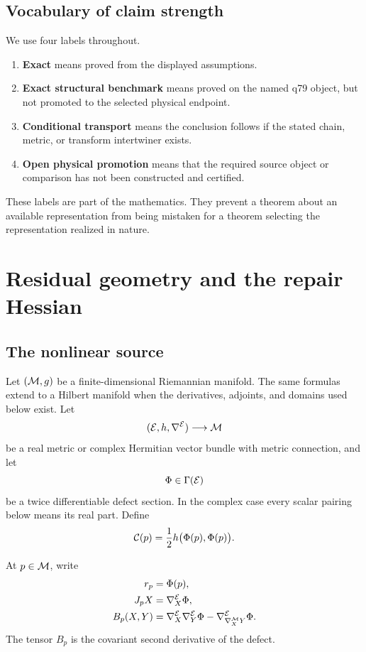 \documentclass[11pt,a4paper]{article}
\begin{document}
\subsection{Vocabulary of claim strength}

We use four labels throughout.
\begin{enumerate}
\item \textbf{Exact} means proved from the displayed assumptions.
\item \textbf{Exact structural benchmark} means proved on the named q79
object, but not promoted to the selected physical endpoint.
\item \textbf{Conditional transport} means the conclusion follows if the
stated chain, metric, or transform intertwiner exists.
\item \textbf{Open physical promotion} means that the required source object
or comparison has not been constructed and certified.
\end{enumerate}
These labels are part of the mathematics.  They prevent a theorem about an
available representation from being mistaken for a theorem selecting the
representation realized in nature.

\section{Residual geometry and the repair Hessian}
\label{sec:residual-hessian}

\subsection{The nonlinear source}

Let \((\mathcal{M},g)\) be a finite-dimensional Riemannian manifold.  The same
formulas extend to a Hilbert manifold when the derivatives, adjoints, and
domains used below exist.  Let
\[
(\mathcal{E},h,\nabla^{\mathcal{E}})\longrightarrow \mathcal{M}
\]
be a real metric or complex Hermitian vector bundle with metric connection,
and let
\[
\Phi\in\Gamma(\mathcal{E})
\]
be a twice differentiable defect section.  In the complex case every scalar
pairing below means its real part.  Define
\begin{equation}
\mathcal{C}(p)=\frac12 h\bigl(\Phi(p),\Phi(p)\bigr).
\label{eq:repair-cost}
\end{equation}

At \(p\in\mathcal{M}\), write
\begin{align}
r_p&=\Phi(p),\\
J_pX&=\nabla_X^{\mathcal{E}}\Phi,\\
B_p(X,Y)&=
\nabla_X^{\mathcal{E}}\nabla_Y^{\mathcal{E}}\Phi
-\nabla_{\nabla_X^{\mathcal{M}}Y}^{\mathcal{E}}\Phi.
\end{align}
The tensor \(B_p\) is the covariant second derivative of the defect.
\end{document}
